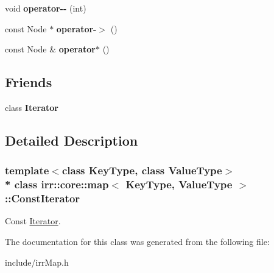 \begin{DoxyCompactItemize}
\item 
void {\bfseries operator-\/-\/} (int)\hypertarget{classirr_1_1core_1_1map_1_1ConstIterator_a780455ee04a273292a7d13c8f7658898}{}\label{classirr_1_1core_1_1map_1_1ConstIterator_a780455ee04a273292a7d13c8f7658898}

\item 
const Node $\ast$ {\bfseries operator-\/$>$} ()\hypertarget{classirr_1_1core_1_1map_1_1ConstIterator_a699be8abf3a2514d1f12bae54cb12d43}{}\label{classirr_1_1core_1_1map_1_1ConstIterator_a699be8abf3a2514d1f12bae54cb12d43}

\item 
const Node \& {\bfseries operator$\ast$} ()\hypertarget{classirr_1_1core_1_1map_1_1ConstIterator_a57444336eeed447575db54fcb8027dfe}{}\label{classirr_1_1core_1_1map_1_1ConstIterator_a57444336eeed447575db54fcb8027dfe}

\end{DoxyCompactItemize}
\subsection*{Friends}
\begin{DoxyCompactItemize}
\item 
class {\bfseries Iterator}\hypertarget{classirr_1_1core_1_1map_1_1ConstIterator_a9830fc407400559db7e7783cc10a9394}{}\label{classirr_1_1core_1_1map_1_1ConstIterator_a9830fc407400559db7e7783cc10a9394}

\end{DoxyCompactItemize}


\subsection{Detailed Description}
\subsubsection*{template$<$class Key\+Type, class Value\+Type$>$\\*
class irr\+::core\+::map$<$ Key\+Type, Value\+Type $>$\+::\+Const\+Iterator}

Const \hyperlink{classirr_1_1core_1_1map_1_1Iterator}{Iterator}. 

The documentation for this class was generated from the following file\+:\begin{DoxyCompactItemize}
\item 
include/irr\+Map.\+h\end{DoxyCompactItemize}
